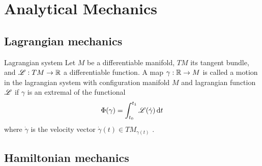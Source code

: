 \chapter{Analytical Mechanics}

\section{Lagrangian mechanics}
\begin{block}{Lagrangian system}
    Let $M$ be a differentiable manifold, $TM$ its tangent bundle, and $\mathscr{L}: TM \to \mathbb{R}$ a differentiable function. A map $\gamma: \mathbb{R} \to M$  is called a motion in the lagrangian system with configuration manifold $M$ and lagrangian function $\mathscr{L}$ if $\gamma$ is an extremal of the functional
    $$ \Phi(\gamma) =  \int^{t_1}_{t_0} \mathscr{L}\qty(\dot{\gamma})\dd{t}$$
    where $\dot{\gamma}$ is the velocity vector $\dot{\gamma}(t) \in TM_{\gamma(t)}$ \cite{Arnold1989}.
\end{block}

\section{Hamiltonian mechanics}